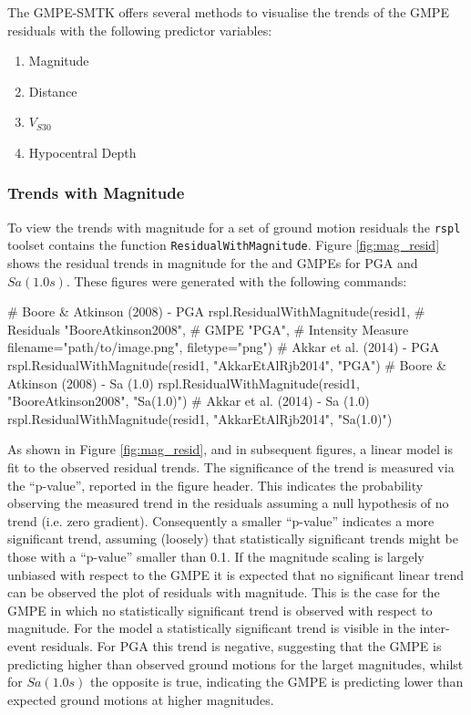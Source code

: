 The GMPE-SMTK offers several methods to visualise the trends of the GMPE residuals with the following predictor variables:
\begin{enumerate}
\item Magnitude
\item Distance
\item $V_{S30}$
\item Hypocentral Depth
\end{enumerate}

\subsubsection{Trends with Magnitude}

To view the trends with magnitude for a set of ground motion residuals the \verb=rspl= toolset contains the function \verb=ResidualWithMagnitude=. Figure \ref{fig:mag_resid} shows the residual trends in magnitude for the \textcite{boore2008} and \textcite{Akkar_etal2014} GMPEs for PGA and $Sa \left( {1.0 s} \right)$. These figures were generated with the following commands:

\begin{python}[frame=single]
# Boore & Atkinson (2008)  - PGA
rspl.ResidualWithMagnitude(resid1,  # Residuals
                           "BooreAtkinson2008",  # GMPE
                           "PGA",   # Intensity Measure
                           filename="path/to/image.png",
                           filetype="png")
# Akkar et al. (2014)  - PGA
rspl.ResidualWithMagnitude(resid1, "AkkarEtAlRjb2014", "PGA") 
# Boore & Atkinson (2008)  - Sa (1.0)
rspl.ResidualWithMagnitude(resid1, "BooreAtkinson2008",
                          "Sa(1.0)") 
# Akkar et al. (2014)  - Sa (1.0)
rspl.ResidualWithMagnitude(resid1, "AkkarEtAlRjb2014",
                          "Sa(1.0)")                         
\end{python}

As shown in Figure \ref{fig:mag_resid}, and in subsequent figures, a linear model is fit to the observed residual trends. The significance of the trend is measured via the ``p-value'', reported in the figure header. This indicates the probability observing the measured trend in the residuals assuming a null hypothesis of no trend (i.e. zero gradient). Consequently a smaller ``p-value'' indicates a more significant trend, assuming (loosely) that statistically significant trends might be those with a ``p-value'' smaller than 0.1. If the magnitude scaling is largely unbiased with respect to the GMPE it is expected that no significant linear trend can be observed the plot of residuals with magnitude. This is the case for the \textcite{Akkar_etal2014} GMPE in which no statistically significant trend is observed with respect to magnitude. For the \textcite{boore2008} model a statistically significant trend is visible in the inter-event residuals. For PGA this trend is negative, suggesting that the GMPE is predicting higher than observed ground motions for the larget magnitudes, whilst for $Sa \left( {1.0 s} \right)$ the opposite is true, indicating the GMPE is predicting lower than expected ground motions at higher magnitudes.

